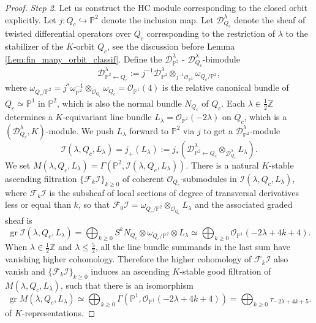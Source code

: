 \documentclass[12pt]{amsart}
\newcommand{\I}{\mathcal{I}}
\newcommand{\Z}{\mathbb{Z}}
\newcommand{\gr}{\operatorname{gr}}
\newcommand{\Pb}{\mathbb{P}}
\newcommand{\OO}{\mathcal{O}}
\theoremstyle{definition}
\numberwithin{equation}{section}
\begin{document}
\begin{proof}
{\it Step 2}. Let us construct the HC module corresponding to the closed orbit explicitly.
Let $j: Q_c \hookrightarrow \Pb^2$ denote the inclusion map. Let $\mathscr{D}^\lambda_{Q_c} $ denote the sheaf of twisted differential operators over $Q_c$ corresponding to the restriction of $\lambda$ to
the stabilizer of the $K$-orbit $Q_c$, see the discussion before Lemma \ref{Lem:fin_many_orbit_classif}.
Define the $\mathscr{D}^\lambda_{\Pb^2}$ - $\mathscr{D}^\lambda_{Q_c}$-bimodule
\[ \mathscr{D}^\lambda_{\Pb^2 \leftarrow Q_c} := j^{-1} \mathscr{D}^\lambda_{\Pb^2} \otimes_{j^{-1} \OO_{\Pb^2}} \omega_{Q_c/\Pb^2},  \]
where $\omega_{Q_c/\Pb^2} = j^* \omega_{\Pb^2}^{-1} \otimes_{\OO_{Q_c}} \omega_{Q_c} = \OO_{\Pb^1}(4)$ is the relative canonical bundle of $Q_c \simeq \Pb^1$ in $\Pb^2$, which is also the normal bundle $N_{Q_c}$ of $Q_c$. Each $\lambda \in \frac{1}{2} \Z$ determines a  $K$-equivariant line bundle $L_\lambda = \OO_{\Pb^2}(-2 \lambda)$ on $Q_c$, which is a $(\mathscr{D}^\lambda_{Q_c}, K)$-module. We push $L_\lambda$ forward to $\Pb^2$ via $j$ to get a $\mathscr{D}^\lambda_{\Pb^2}$-module
\[  \mathcal{I}(\lambda, Q_c, L_\lambda) = j_+(L_\lambda) := j_* (\mathscr{D}^\lambda_{\Pb^2 \leftarrow Q_c} \otimes_{\mathscr{D}^\lambda_{Q_c}} L_\lambda ).  \]
We set $M(\lambda, Q_c, L_\lambda) = \Gamma(\Pb^2, \I(\lambda, Q_c, L_\lambda))$. There is a natural $K$-stable ascending filtration $\{ \mathcal{F}_k \I \}_{k \geqslant 0}$ of coherent $\OO_{Q_c}$-submodules in $\mathcal{I}(\lambda, Q_c, L_\lambda)$, where $\mathcal{F}_k \I$ is the subsheaf of local sections of degree of transversal derivatives
less or equal than $k$, so that $\mathcal{F}_0 \I = \omega_{Q_c/\Pb^2} \otimes_{\OO_{Q_c}} L_\lambda$ and  the associated graded sheaf is
  \[ \gr \I(\lambda, Q_c, L_\lambda) = \bigoplus_{k \geqslant 0} S^k N_{Q_c} \otimes  \omega_{Q_c/\Pb^2} \otimes  L_\lambda \simeq \bigoplus_{k \geqslant 0} \OO_{\Pb^1}(-2\lambda + 4k + 4). \]
When $\lambda \in \frac{1}{2} \Z$ and $\lambda \leqslant \frac{5}{2}$, all the line bundle summands in the last sum have vanishing higher cohomology. Therefore the higher cohomology of $\mathcal{F}_k \I$ also vanish and $\{ \mathcal{F}_k \I \}_{k \geqslant 0}$ induces an ascending $K$-stable good filtration of $M(\lambda, Q_c, L_\lambda)$, such that there is an isomorphism
  \begin{equation}\label{eq:K_Q_closed}
	\gr M(\lambda, Q_c, L_\lambda) \simeq \bigoplus_{k \geqslant 0} \Gamma(\Pb^1, \OO_{\Pb^1}(-2\lambda + 4k + 4)) = \bigoplus_{k \geqslant 0} \tau_{-2\lambda + 4k + 5}.
\end{equation}
of $K$-representations.


\end{proof}
\end{document}
